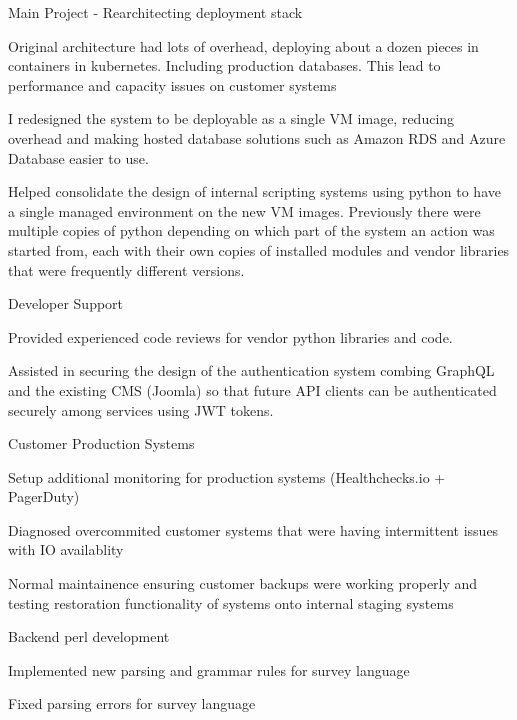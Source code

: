 \documentclass[table,tmargin=1in,bmargin=1in,letterpaper]{resume}
\begin{document}
\begin{compactitem}
\item Main Project - Rearchitecting deployment stack
  \begin{compactitem}
  \item Original architecture had lots of overhead, deploying about a dozen pieces in containers in kubernetes.  Including production databases.  This lead to performance and capacity issues on customer systems
  \item I redesigned the system to be deployable as a single VM image, reducing overhead and making hosted database solutions such as Amazon RDS and Azure Database easier to use.
  \item Helped consolidate the design of internal scripting systems using python to have a single managed environment on the new VM images.  Previously there were multiple copies of python depending on which part of the system an action was started from, each with their own copies of installed modules and vendor libraries that were frequently different versions.
  \end{compactitem}
\item Developer Support
  \begin{compactitem}
  \item Provided experienced code reviews for vendor python libraries and code.
  \item Assisted in securing the design of the authentication system combing GraphQL and the existing CMS (Joomla) so that future API clients can be authenticated securely among services using JWT tokens.
  \end{compactitem}
\item Customer Production Systems
  \begin{compactitem}
  \item Setup additional monitoring for production systems (Healthchecks.io + PagerDuty)
  \item Diagnosed overcommited customer systems that were having intermittent issues with IO availablity
  \item Normal maintainence ensuring customer backups were working properly and testing restoration functionality of systems onto internal staging systems  
  \end{compactitem}
\end{compactitem}

\begin{compactitem}
\item Backend perl development
  \begin{compactitem}
  \item Implemented new parsing and grammar rules for survey language
  \item Fixed parsing errors for survey language
  \end{compactitem}
\end{compactitem}
\end{document}
